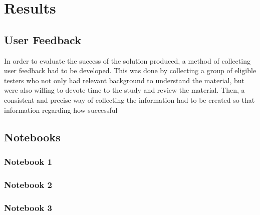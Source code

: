 \chapter{Results}
\label{chapter3}


\section{User Feedback}

In order to evaluate the success of the solution produced, a method of collecting user feedback had to be developed. This was done by collecting a group of eligible testers who not only had relevant background to understand the material, but were also willing to devote time to the study and review the material. Then, a consistent and precise way of collecting the information had to be created so that information regarding how successful 

\section{Notebooks}

\subsection{Notebook 1}

\subsection{Notebook 2}

\subsection{Notebook 3}